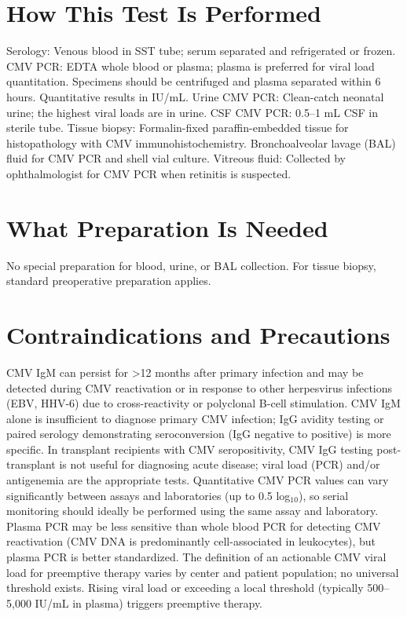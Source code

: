 \section*{How This Test Is Performed}
Serology: Venous blood in SST tube; serum separated and refrigerated or frozen. CMV PCR: EDTA whole blood or plasma; plasma is preferred for viral load quantitation. Specimens should be centrifuged and plasma separated within 6 hours. Quantitative results in IU/mL. Urine CMV PCR: Clean-catch neonatal urine; the highest viral loads are in urine. CSF CMV PCR: 0.5--1 mL CSF in sterile tube. Tissue biopsy: Formalin-fixed paraffin-embedded tissue for histopathology with CMV immunohistochemistry. Bronchoalveolar lavage (BAL) fluid for CMV PCR and shell vial culture. Vitreous fluid: Collected by ophthalmologist for CMV PCR when retinitis is suspected.

\section*{What Preparation Is Needed}
No special preparation for blood, urine, or BAL collection. For tissue biopsy, standard preoperative preparation applies.

\section*{Contraindications and Precautions}
CMV IgM can persist for >12 months after primary infection and may be detected during CMV reactivation or in response to other herpesvirus infections (EBV, HHV-6) due to cross-reactivity or polyclonal B-cell stimulation. CMV IgM alone is insufficient to diagnose primary CMV infection; IgG avidity testing or paired serology demonstrating seroconversion (IgG negative to positive) is more specific. In transplant recipients with CMV seropositivity, CMV IgG testing post-transplant is not useful for diagnosing acute disease; viral load (PCR) and/or antigenemia are the appropriate tests. Quantitative CMV PCR values can vary significantly between assays and laboratories (up to 0.5 log$_{10}$), so serial monitoring should ideally be performed using the same assay and laboratory. Plasma PCR may be less sensitive than whole blood PCR for detecting CMV reactivation (CMV DNA is predominantly cell-associated in leukocytes), but plasma PCR is better standardized. The definition of an actionable CMV viral load for preemptive therapy varies by center and patient population; no universal threshold exists. Rising viral load or exceeding a local threshold (typically 500--5,000 IU/mL in plasma) triggers preemptive therapy.

